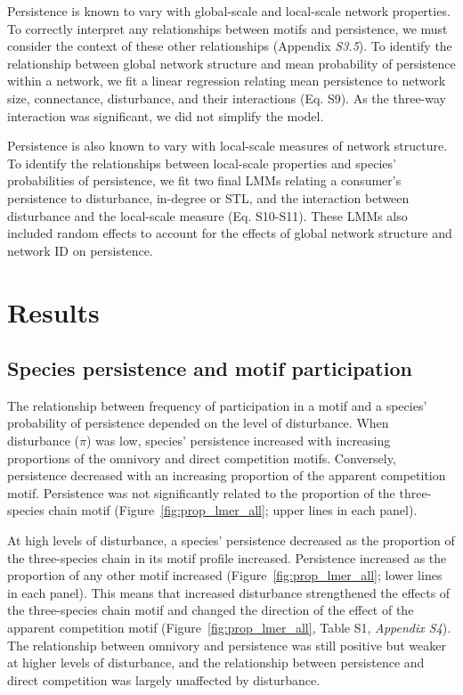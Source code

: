 \documentclass[12pt]{article}
\begin{document}
\begin{spacing}{2.0}
            Persistence is known to vary with global-scale and local-scale network properties.
            To correctly interpret any relationships between motifs and persistence, we must consider the context of these other relationships (Appendix \emph{S3.5}).
            To identify the relationship between global network structure and mean probability of persistence within a network, we fit a linear regression relating mean persistence to network size, connectance, disturbance, and their interactions (Eq. S9).
            As the three-way interaction was significant, we did not simplify the model. 


            Persistence is also known to vary with local-scale measures of network structure. 
            To identify the relationships between local-scale properties and species' probabilities of persistence, we fit two final LMMs relating a consumer's persistence to disturbance, in-degree or STL, and the interaction between disturbance and the local-scale measure (Eq. S10-S11).
            These LMMs also included random effects to account for the effects of global network structure and network ID on persistence.


\section*{Results}

    \subsection*{Species persistence and motif participation} 
       The relationship between frequency of participation in a motif and a species' probability of persistence depended on the level of disturbance. 
       When disturbance ($\pi$) was low, species' persistence increased with increasing proportions of the omnivory and direct competition motifs. 
       Conversely, persistence decreased with an increasing proportion of the apparent competition motif. 
       Persistence was not significantly related to the proportion of the three-species chain motif (Figure~\ref{fig:prop_lmer_all}; upper lines in each panel).
            
            
        At high levels of disturbance, a species' persistence decreased as the proportion of the three-species chain in its motif profile increased.
        Persistence increased as the proportion of any other motif increased (Figure~\ref{fig:prop_lmer_all}; lower lines in each panel). 
        This means that increased disturbance strengthened the effects of the three-species chain motif and changed the direction of the effect of the apparent competition motif  (Figure~\ref{fig:prop_lmer_all}, Table S1, \emph{Appendix S4}).
        The relationship between omnivory and persistence was still positive but weaker at higher levels of disturbance, and the relationship between persistence and direct competition was largely unaffected by disturbance.


\end{spacing}
\end{document}
